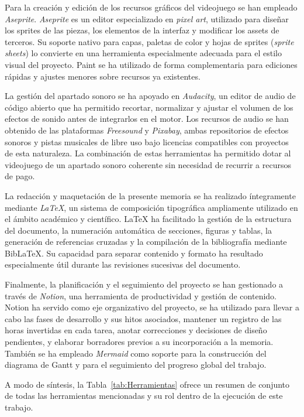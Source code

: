 Para la creación y edición de los recursos gráficos del videojuego se han empleado \textit{Aseprite}. \textit{Aseprite} es un editor especializado en \textit{pixel art}, utilizado para diseñar los sprites de las piezas, los elementos de la interfaz y modificar los assets de terceros. Su soporte nativo para capas, paletas de color y hojas de sprites (\textit{sprite sheets}) lo convierte en una herramienta especialmente adecuada para el estilo visual del proyecto. Paint se ha utilizado de forma complementaria para ediciones rápidas y ajustes menores sobre recursos ya existentes.

La gestión del apartado sonoro se ha apoyado en \textit{Audacity}, un editor de audio de código abierto que ha permitido recortar, normalizar y ajustar el volumen de los efectos de sonido antes de integrarlos en el motor. Los recursos de audio se han obtenido de las plataformas \textit{Freesound} y \textit{Pixabay}, ambas repositorios de efectos sonoros y pistas musicales de libre uso bajo licencias compatibles con proyectos de esta naturaleza. La combinación de estas herramientas ha permitido dotar al videojuego de un apartado sonoro coherente sin necesidad de recurrir a recursos de pago.

La redacción y maquetación de la presente memoria se ha realizado íntegramente mediante \textit{\LaTeX}, un sistema de composición tipográfica ampliamente utilizado en el ámbito académico y científico. \LaTeX{} ha facilitado la gestión de la estructura del documento, la numeración automática de secciones, figuras y tablas, la generación de referencias cruzadas y la compilación de la bibliografía mediante Bib\LaTeX. Su capacidad para separar contenido y formato ha resultado especialmente útil durante las revisiones sucesivas del documento.

Finalmente, la planificación y el seguimiento del proyecto se han gestionado a través de \textit{Notion}, una herramienta de productividad y gestión de contenido. Notion ha servido como eje organizativo del proyecto, se ha utilizado para llevar a cabo las fases de desarrollo y sus hitos asociados, mantener un registro de las horas invertidas en cada tarea, anotar correcciones y decisiones de diseño pendientes, y elaborar borradores previos a su incorporación a la memoria. También se ha empleado \textit{Mermaid} como soporte para la construcción del diagrama de Gantt y para el seguimiento del progreso global del trabajo.

A modo de síntesis, la Tabla~\ref{tab:Herramientas} ofrece un resumen de conjunto de todas las herramientas mencionadas y su rol dentro de la ejecución de este trabajo.


